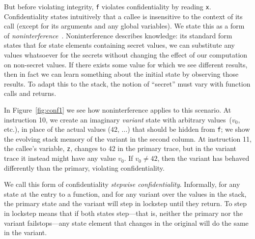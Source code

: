 \documentclass[10pt,conference]{ieeetran}%
\theoremstyle{definition}
\begin{document}
But before violating integrity, {\tt f} violates confidentiality by
reading {\tt x}.
Confidentiality states intuitively that a callee is insensitive to
the context of its call (except for its arguments and any global
variables).
We state this as a form of {\em noninterference}~\cite{Goguen1982SecurityPA}.
Noninterference describes knowledge: its standard form states that for state elements
containing secret values, we can substitute any values whatsoever for the secrets
without changing the effect of our computation on non-secret values.
If there exists some value for which we see different results, then
in fact we can learn something about the initial state by observing those results.
To adapt this to the stack, the notion of ``secret'' must vary with function
calls and returns.

In Figure~\ref{fig:conf1} we see how noninterference applies to this scenario.
At instruction 10, we
create an imaginary {\em variant}
state with arbitrary values\ifaftersubmission{}\fi~(\(v_0\), etc.),
in place of the actual values ($42$, ...) that should
be hidden from {\tt f}; we show the evolving stack memory of the variant in the second column.
At instruction 11, the callee's variable, {\tt z},
changes to 42 in the primary trace, but
in the variant trace it instead might have any value \(v_0\). If \(v_0 \neq 42\), then the variant
has behaved differently than the primary, violating confidentiality.

We call this form of confidentiality {\em stepwise confidentiality}. Informally,
for any state at the entry to a function, and for any variant over the values in the stack,
the primary state and the variant will step in lockstep until they
return. To step in lockstep
means that if both states step---that is, neither the primary nor the variant failstops---any
state element that changes in the original will do the same in the variant.
\end{document}
